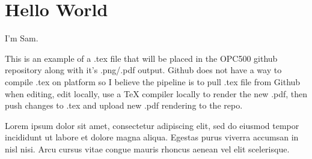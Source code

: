 \documentclass{article}
\begin{document}
\section{Hello World} 

I'm Sam.

This is an example of a .tex file that will be placed in the OPC500 github repository along with it's .png/.pdf output. Github does not have a way to compile .tex on platform so I believe the pipeline is to pull .tex file from Github when editing, edit locally, use a TeX compiler locally to render the new .pdf, then push changes to .tex and upload new .pdf rendering to the repo.

Lorem ipsum dolor sit amet, consectetur adipiscing elit, sed do eiusmod tempor incididunt ut labore et dolore magna aliqua. Egestas purus viverra accumsan in nisl nisi. Arcu cursus vitae congue mauris rhoncus aenean vel elit scelerisque. 
\end{document}
